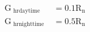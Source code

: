 \documentclass[12pt]{article}
\begin{document}
\begin{displaymath}
\begin{aligned} \mathrm{G}_{\text { hrdaytime }} &=0.1 \mathrm{R}_{\mathrm{n}} \\ \mathrm{G}_{\text { hrnighttime }} &=0.5 \mathrm{R}_{\mathrm{n}} \end{aligned}
\end{displaymath}
\end{document}
